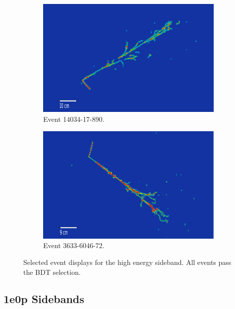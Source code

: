 \begin{figure}[H]
\begin{center}
\begin{subfigure}{0.45\textwidth}
    \includegraphics[width=1.00\textwidth]{Sidebands/Figures/1eNp/HighEnergy/EVD/raw/14034_17_890_Y_raw.png}
    \caption{Event 14034-17-890.}
    \end{subfigure}
    \begin{subfigure}{0.45\textwidth}
    \includegraphics[width=1.00\textwidth]{Sidebands/Figures/1eNp/HighEnergy/EVD/raw/3633_6046_72_Y_raw.png}
    \caption{Event 3633-6046-72.}
    \end{subfigure}
    \caption{\label{fig:sb:1eNp:he:evd:raw} Selected event displays for the \npsel high energy sideband. All events pass the BDT selection.}
    \end{center}
\end{figure}
\subsection{1e0p Sidebands}
\label{sec:sideband:1e0p}

